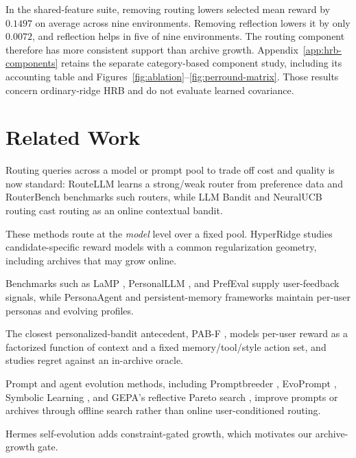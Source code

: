 \documentclass{article} %
\begin{document}
In the shared-feature suite, removing routing lowers selected mean reward
by $0.1497$ on average across nine environments. Removing reflection lowers
it by only $0.0072$, and reflection helps in five of nine environments.
The routing component therefore has more consistent support than archive
growth. Appendix~\ref{app:hrb-components} retains the separate category-based
component study, including its accounting table and
Figures~\ref{fig:ablation}--\ref{fig:perround-matrix}. Those results concern
ordinary-ridge HRB and do not evaluate learned covariance.

\section{Related Work}

\label{sec:related}

Routing queries across a model or prompt pool to trade off cost and quality is now standard: RouteLLM \citep{ong2024routellm} learns a strong/weak router from preference data and RouterBench \citep{hu2024routerbench} benchmarks such routers, while LLM Bandit \citep{li2025llmbandit} and NeuralUCB routing \citep{tsai2026neuralucb} cast routing as an online contextual bandit.

These methods route at the \emph{model} level over a fixed pool.
HyperRidge studies candidate-specific reward models with a common
regularization geometry, including archives that may grow online.

Benchmarks such as LaMP \citep{salemi2023lamp}, PersonalLLM \citep{zollo2024personalllm}, and PrefEval \citep{zhao2025prefeval} supply user-feedback signals, while PersonaAgent \citep{zhang2025personaagent} and persistent-memory frameworks \citep{westhausser2025persistent} maintain per-user personas and evolving profiles.

The closest personalized-bandit antecedent, PAB-F \citep{jin2026personalizing}, models per-user reward as a factorized function of context and a fixed memory/tool/style action set, and studies regret against an in-archive oracle.

Prompt and agent evolution methods, including Promptbreeder \citep{fernando2023promptbreeder}, EvoPrompt \citep{guo2024evoprompt}, Symbolic Learning \citep{zhou2024symbolic}, and GEPA's reflective Pareto search \citep{agrawal2025geparp}, improve prompts or archives through offline search rather than online user-conditioned routing.

Hermes self-evolution \citep{hermes_selfevolution,hermes_agent} adds constraint-gated growth, which motivates our archive-growth gate.
\end{document}
